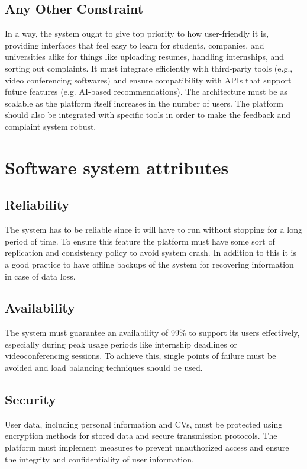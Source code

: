\subsection{Any Other Constraint}
\label{subsec: hardware_limitations}%
In a way, the system ought to give top priority to how user-friendly it is, providing interfaces that feel easy to learn for students, companies, and universities alike for things like uploading resumes, handling internships, and sorting out complaints. It must integrate efficiently with third-party tools (e.g., video conferencing softwares) and ensure compatibility with APIs that support future features (e.g. AI-based recommendations).  The architecture must be as scalable as the platform itself increases in the number of users. The platform should also be integrated with specific tools in order to make the feedback and complaint system robust.
\section{Software system attributes}
\label{sec:performance_requirements}%

\subsection{Reliability}
\label{subsec: reliability}%
The system has to be reliable since it will have to run without stopping for a long period of time. To ensure this feature the platform must have some sort of replication and consistency policy to avoid system crash. In addition to this it is a good practice to have offline backups of the system for recovering information in case of data loss. 
\subsection{Availability}
\label{subsec: availability}%
The system must guarantee an availability of 99\% to support its users effectively, especially during peak usage periods like internship deadlines or videoconferencing sessions. To achieve this, single points of failure must be avoided and load balancing techniques should be used. 
\subsection{Security}
\label{subsec: security }%
User data, including personal information and CVs, must be protected using encryption methods for stored data and secure transmission protocols. The platform must implement measures to prevent unauthorized access and ensure the integrity and confidentiality of user information. 
